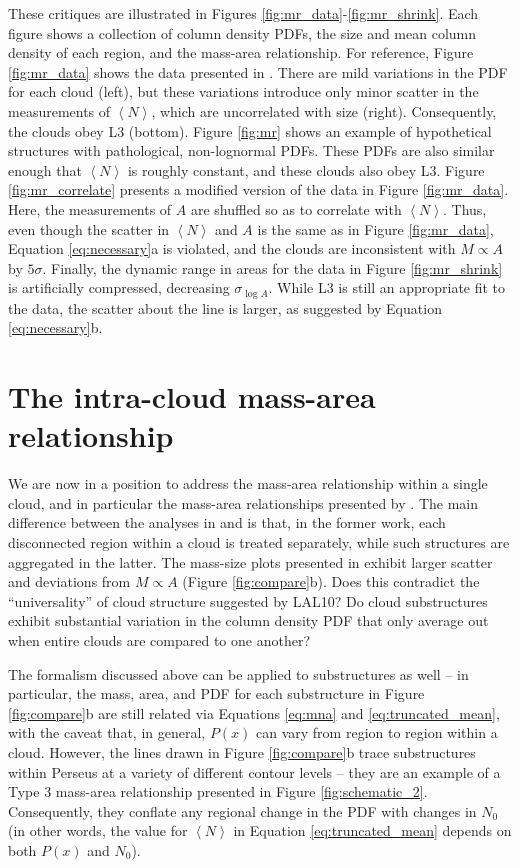 These critiques are illustrated in Figures \ref{fig:mr_data}-\ref{fig:mr_shrink}. Each figure shows a collection of column density PDFs, the size and mean column density of each region, and the mass-area relationship. For reference, Figure \ref{fig:mr_data} shows the data presented in \cite{Lombardi10}. There are mild variations in the PDF for each cloud (left), but these variations introduce only minor scatter in the measurements of $\left<N\right>$, which are uncorrelated with size (right). Consequently, the clouds obey L3 (bottom). Figure \ref{fig:mr} shows an example of hypothetical structures with pathological, non-lognormal PDFs. These PDFs are also similar enough that $\left<N\right>$ is roughly constant, and these clouds also obey L3. Figure \ref{fig:mr_correlate} presents a modified version of the data in Figure \ref{fig:mr_data}. Here, the measurements of $A$ are shuffled so as to correlate with $\left<N\right>$. Thus, even though the scatter in $\left<N\right>$ and $A$ is the same as in Figure \ref{fig:mr_data}, Equation \ref{eq:necessary}a is violated, and the clouds are inconsistent with $M \propto A$ by $5 \sigma$. Finally, the dynamic range in areas for the data in Figure \ref{fig:mr_shrink} is artificially compressed, decreasing $\sigma_{\log A}$. While L3 is still an appropriate fit to the data, the scatter about the line is larger, as suggested by Equation \ref{eq:necessary}b.

\section{The intra-cloud mass-area relationship}
\label{sec:intra}
We are now in a position to address the mass-area relationship within a single cloud, and in particular the mass-area relationships presented by \cite{Kauffmann10a}. The main difference between the analyses in \cite{Kauffmann10a} and \cite{Lombardi10} is that, in the former work, each disconnected region within a cloud is treated separately, while such structures are aggregated in the latter. The mass-size plots presented in \cite{Kauffmann10a} exhibit larger scatter and deviations from $M \propto A$ (Figure \ref{fig:compare}b). Does this contradict the ``universality'' of cloud structure suggested by LAL10? Do cloud substructures exhibit substantial variation in the column density PDF that only average out when entire clouds are compared to one another?

The formalism discussed above can be applied to substructures as well -- in particular, the mass, area, and PDF for each substructure in Figure \ref{fig:compare}b are still related via Equations \ref{eq:mna} and \ref{eq:truncated_mean}, with the caveat that, in general, $P(x)$ can vary from region to region within a cloud. However, the lines drawn in Figure \ref{fig:compare}b trace substructures within Perseus at a variety of different contour levels -- they are an example of a Type 3 mass-area relationship presented in Figure \ref{fig:schematic_2}. Consequently, they conflate any regional change in the PDF with changes in $N_0$ (in other words, the value for $\left<N\right>$ in Equation \ref{eq:truncated_mean} depends on both $P(x)$ and $N_0$).

